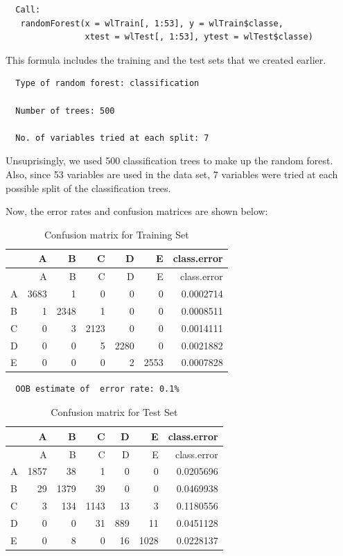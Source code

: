 \documentclass[12pt,twoside]{reedthesis}
\begin{document}
  \begin{verbatim}
  Call:
   randomForest(x = wlTrain[, 1:53], y = wlTrain$classe,
                xtest = wlTest[, 1:53], ytest = wlTest$classe) 
  \end{verbatim}
  
  This formula includes the training and the test sets that we created
  earlier.
  
  \begin{verbatim}
  Type of random forest: classification
  
  Number of trees: 500
  
  No. of variables tried at each split: 7
  \end{verbatim}
  
  Unsuprisingly, we used 500 classification trees to make up the random
  forest. Also, since 53 variables are used in the data set, 7 variables
  were tried at each possible split of the classification trees.
  
  Now, the error rates and confusion matrices are shown below:
  
  \begin{longtable}[c]{@{}lrrrrrr@{}}
  \caption{Confusion matrix for Training Set}\tabularnewline
  \toprule
  & A & B & C & D & E & class.error\tabularnewline
  \midrule
  \endfirsthead
  \toprule
  & A & B & C & D & E & class.error\tabularnewline
  \midrule
  \endhead
  A & 3683 & 1 & 0 & 0 & 0 & 0.0002714\tabularnewline
  B & 1 & 2348 & 1 & 0 & 0 & 0.0008511\tabularnewline
  C & 0 & 3 & 2123 & 0 & 0 & 0.0014111\tabularnewline
  D & 0 & 0 & 5 & 2280 & 0 & 0.0021882\tabularnewline
  E & 0 & 0 & 0 & 2 & 2553 & 0.0007828\tabularnewline
  \bottomrule
  \end{longtable}
  
  \begin{verbatim}
  OOB estimate of  error rate: 0.1%
  \end{verbatim}
  
  \newpage
  
  \begin{longtable}[c]{@{}lrrrrrr@{}}
  \caption{Confusion matrix for Test Set}\tabularnewline
  \toprule
  & A & B & C & D & E & class.error\tabularnewline
  \midrule
  \endfirsthead
  \toprule
  & A & B & C & D & E & class.error\tabularnewline
  \midrule
  \endhead
  A & 1857 & 38 & 1 & 0 & 0 & 0.0205696\tabularnewline
  B & 29 & 1379 & 39 & 0 & 0 & 0.0469938\tabularnewline
  C & 3 & 134 & 1143 & 13 & 3 & 0.1180556\tabularnewline
  D & 0 & 0 & 31 & 889 & 11 & 0.0451128\tabularnewline
  E & 0 & 8 & 0 & 16 & 1028 & 0.0228137\tabularnewline
  \bottomrule
  \end{longtable}
  
\end{document}
